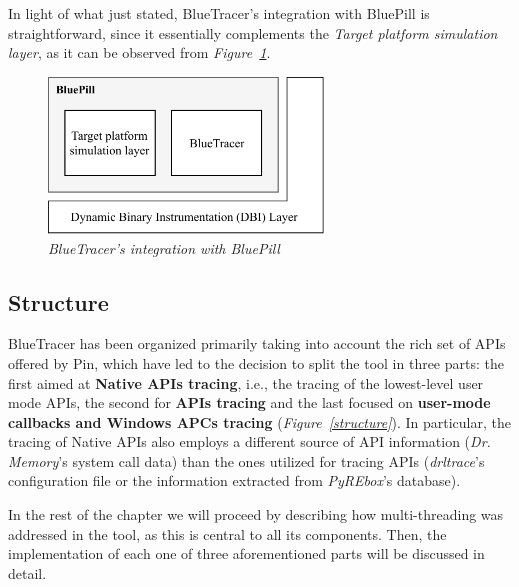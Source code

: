 In light of what just stated, BlueTracer's integration with BluePill is straightforward, since it essentially complements the \textit{Target platform simulation layer}, as it can be observed from \textit{Figure~\ref{BluePill}}.
\\
\begin{figure}[h]
\centering
\includegraphics[width=0.65\textwidth]{Figures/BluePill.pdf}
\caption{\textit{BlueTracer's integration with BluePill}}
\label{BluePill}
\end{figure}


\subsection{Structure}
   

BlueTracer has been organized primarily taking into account the rich set of APIs offered by Pin, which have led to the decision to split the tool in three parts: the first aimed at \textbf{Native APIs tracing}, i.e., the tracing of the lowest-level user mode APIs,  the second for \textbf{APIs tracing} and the last focused on \textbf{user-mode callbacks and Windows APCs tracing} (\textit{Figure~\ref{structure}}). In particular, the tracing of Native APIs also employs a different source of API information (\textit{Dr. Memory}'s system call data) than the ones utilized for tracing APIs (\textit{drltrace}'s configuration file or the information extracted from \textit{PyREbox}'s database).

In the rest of the chapter we will proceed by describing how multi-threading was addressed in the tool, as this is central to all its components. Then, the implementation of each one of three aforementioned parts will be discussed in detail. 

